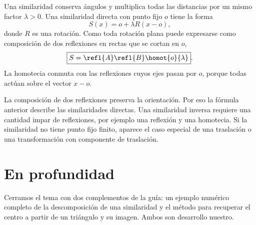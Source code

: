 Una similaridad conserva ángulos y multiplica todas las distancias por un mismo factor
\(\lambda>0\). Una similaridad directa con punto fijo \(o\) tiene la forma
\[
  S(x)=o+\lambda R(x-o),
\]
donde \(R\) es una rotación. Como toda rotación plana puede expresarse como composición de
dos reflexiones en rectas que se cortan en \(o\),
\[
  \boxed{S=\refl{A}\refl{B}\homot{o}{\lambda}}.
\]
La homotecia conmuta con las reflexiones cuyos ejes pasan por \(o\), porque todas actúan
sobre el vector \(x-o\).

\begin{center}
\end{center}

\begin{atencion}
La composición de dos reflexiones preserva la orientación. Por eso la fórmula anterior
describe las similaridades directas. Una similaridad inversa requiere una cantidad impar de
reflexiones, por ejemplo una reflexión y una homotecia. Si la similaridad no tiene punto fijo
finito, aparece el caso especial de una traslación o una transformación con componente de
traslación.
\end{atencion}

\section{En profundidad}

Cerramos el tema con dos complementos de la guía: un ejemplo numérico completo de la descomposición de una similaridad y el método para recuperar el centro a partir de un triángulo y su imagen. Ambos son desarrollo nuestro.

